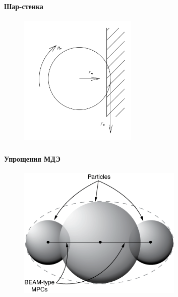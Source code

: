 \documentclass[c]{beamer}  %
\begin{document}
\begin{frame}
\frametitle{\insertsection} 
\framesubtitle{Шар-стенка}

\begin{figure}[h!]
	\centering
	\includegraphics[width=0.5\textwidth]{ball_wall}
\end{figure} 
\end{frame}


\begin{frame}
\frametitle{\insertsection} 
\framesubtitle{Упрощения МДЭ}

\begin{figure}[h!]
	\centering
	\includegraphics[width=0.7\textwidth]{dem-rigid-cluster}
\end{figure} 
\end{frame}




 
\end{document}
